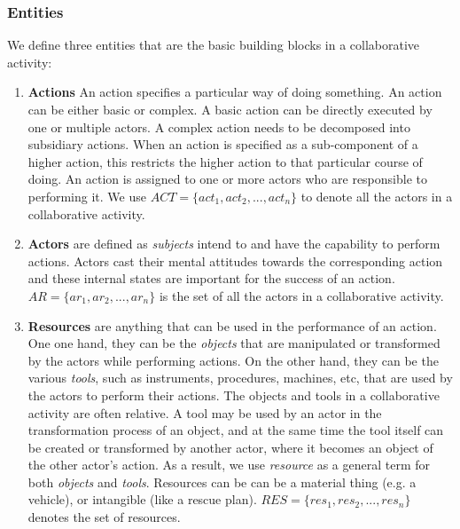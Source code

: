 \subsubsection{Entities} %
\label{ssub:entities}
We define three entities that are the basic building blocks in a collaborative activity:
\begin{enumerate}
	\item \textbf{Actions} An action specifies a particular way of doing something. An action can be either basic or complex. A basic action can be directly executed by one or multiple actors. A complex action needs to be decomposed into subsidiary actions. When an action is specified as a sub-component of a higher action, this restricts the higher action to that particular course of doing. An action is assigned to one or more actors who are responsible to performing it. We use $ACT=\{act_1, act_2, ..., act_n\}$ to denote all the actors in a collaborative activity.
   \item \textbf{Actors} are defined as \emph{subjects} intend to and have the capability to perform actions. Actors cast their mental attitudes towards the corresponding action and these internal states are important for the success of an action. $AR=\{ar_1, ar_2, ..., ar_n\}$ is the set of all the actors in a collaborative activity.
   \item \textbf{Resources} are anything that can be used in the performance of an action. One one hand, they can be the \emph{objects} that are manipulated or transformed by the actors while performing actions. On the other hand, they can be the various \emph{tools}, such as instruments, procedures, machines, etc, that are used by the actors to perform their actions. The objects and tools in a collaborative activity are often relative. A tool may be used by an actor in the transformation process of an object, and at the same time the tool itself can be created or transformed by another actor, where it becomes an object of the other actor's action. As a result, we use \emph{resource} as a general term for both \emph{objects} and \emph{tools}. Resources can be can be a material thing (e.g. a vehicle), or intangible (like a rescue plan). $RES=\{res_1, res_2, ..., res_n\}$ denotes the set of resources. 
\end{enumerate}

